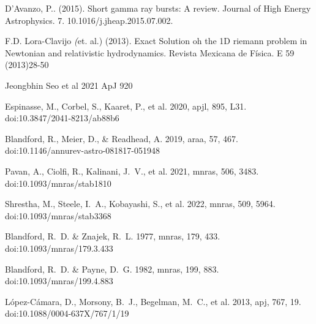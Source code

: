 \documentclass[12pt,a4paper]{book}
\begin{document}
\begin{thebibliography}{20}
D'Avanzo, P.. (2015). Short gamma ray bursts: A review. Journal of High Energy Astrophysics. 7. 10.1016/j.jheap.2015.07.002. 

F.D. Lora-Clavijo \emph(et. al.) (2013). Exact Solution oh the 1D riemann problem in Newtonian and relativistic hydrodynamics. Revista Mexicana de Física. E 59 (2013)28-50 

Jeongbhin Seo et al 2021 ApJ 920 

 Espinasse, M., Corbel, S., Kaaret, P., et al. 2020, apjl, 895, L31. doi:10.3847/2041-8213/ab88b6


 Blandford, R., Meier, D., \& Readhead, A. 2019, araa, 57, 467. doi:10.1146/annurev-astro-081817-051948

 Pavan, A., Ciolfi, R., Kalinani, J.~V., et al. 2021, mnras, 506, 3483. doi:10.1093/mnras/stab1810

 Shrestha, M., Steele, I.~A., Kobayashi, S., et al. 2022, mnras, 509, 5964. doi:10.1093/mnras/stab3368

 Blandford, R.~D. \& Znajek, R.~L. 1977, mnras, 179, 433. doi:10.1093/mnras/179.3.433

 Blandford, R.~D. \& Payne, D.~G. 1982, mnras, 199, 883. doi:10.1093/mnras/199.4.883


 L{\'o}pez-C{\'a}mara, D., Morsony, B.~J., Begelman, M.~C., et al. 2013, apj, 767, 19. doi:10.1088/0004-637X/767/1/19



\end{thebibliography}
\end{document}
